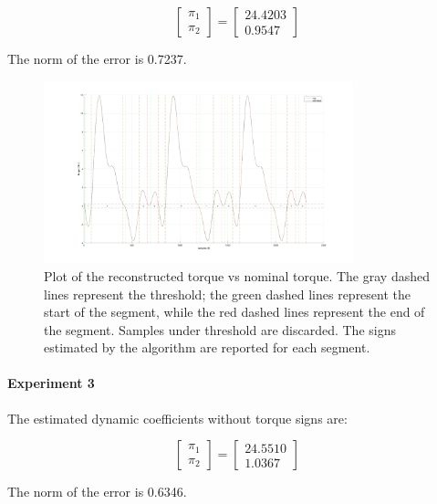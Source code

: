 \documentclass{article}
\begin{document}
\[\begin{bmatrix}
\pi_1  \\ \pi_2 
\end{bmatrix}=\begin{bmatrix}
24.4203 \\ 0.9547
\end{bmatrix}\]

The norm of the error is 0.7237.

\begin{figure}[!htbp]
\centering
\includegraphics[width=0.8\textwidth]{images/1-dof/results_new_experiment4.png}
\caption{Plot of the reconstructed torque vs nominal torque. The gray dashed lines represent the threshold; the green dashed lines represent the start of the segment, while the red dashed lines represent the end of the segment. Samples under threshold are discarded. The signs estimated by the algorithm are reported for each segment.}
\end{figure}
\FloatBarrier

\paragraph{Experiment 3} The estimated dynamic coefficients without torque signs are:

\[\begin{bmatrix}
\pi_1  \\ \pi_2 
\end{bmatrix}=\begin{bmatrix}
24.5510 \\ 1.0367
\end{bmatrix}\]

The norm of the error is 0.6346.
\end{document}
